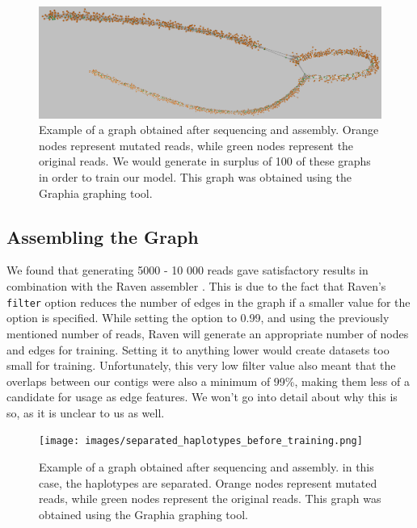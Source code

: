 \documentclass[times, utf8, diplomski, english]{fer_eng}
\begin{document}
\begin{figure}[h]
	\centering
	\includegraphics[width=\textwidth]{images/graph_example.png}
	\caption[Graph]{Example of a graph obtained after sequencing and assembly. Orange nodes represent mutated reads, while green nodes represent the original reads. We would generate in surplus of 100 of these graphs in order to train our model. This graph was obtained using the Graphia\footnotemark{} graphing tool.}
	\label{fig:graph}
\end{figure}

\subsection{Assembling the Graph}
\label{subsec:assembling the graph}

We found that generating 5000 - 10 000 reads gave satisfactory results in combination with the Raven assembler \cite{Vaser}. This is due to the fact that Raven's \texttt{filter} option reduces the number of edges in the graph if a smaller value for the option is specified. While setting the option to 0.99, and using the previously mentioned number of reads, Raven will generate an appropriate number of nodes and edges for training. Setting it to anything lower would create datasets too small for training. Unfortunately, this very low filter value also meant that the overlaps between our contigs were also a minimum of 99\%, making them less of a candidate for usage as edge features. We won't go into detail about why this is so, as it is unclear to us as well.

\begin{figure}[h]
	\centering
	\texttt{[image: images/separated\_haplotypes\_before\_training.png]}
	\caption[Separated graph]{Example of a graph obtained after sequencing and assembly. in this case, the haplotypes are separated. Orange nodes represent mutated reads, while green nodes represent the original reads. This graph was obtained using the Graphia\footnotemark{} graphing tool.}
	\label{fig:separated graph}
\end{figure}
\end{document}
